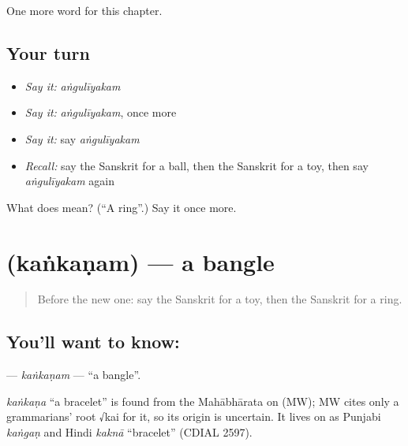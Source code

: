 \begin{grammarlens}[title={What you've built}]
One more word for this chapter.
\end{grammarlens}

\subsection*{Your turn}
\begin{itemize}
\raggedright
  \item \emph{Say it:} \emph{aṅgulīyakam}
  \item \emph{Say it:} \emph{aṅgulīyakam}, once more
  \item \emph{Say it:} say \emph{aṅgulīyakam}
  \item \emph{Recall:} say the Sanskrit for a ball, then the Sanskrit for a toy, then say \emph{aṅgulīyakam} again
\end{itemize}

\begin{tcolorbox}[breakable,colback=teal!4,colframe=teal!35!black,title={Before you move on}]
What does  mean? (\textquotedblleft{}A ring\textquotedblright{}.) Say it once more.
\end{tcolorbox}
\section[\texorpdfstring{\sk{कंकणम्} (kaṅkaṇam)}{कंकणम् (kaṅkaṇam)}]{ (kaṅkaṇam) — a bangle}

\label{lesson:SA-C103-kankanam}



\begin{quote}
Before the new one: say the Sanskrit for a toy, then the Sanskrit for a ring.
\end{quote}

\subsection*{You'll want to know: }
\textbf{} — \emph{kaṅkaṇam} — \textquotedblleft{}a bangle\textquotedblright{}.

\begin{cousinweb}
\emph{kaṅkaṇa} \textquotedblleft{}a bracelet\textquotedblright{} is found from the Mahābhārata on (MW); MW cites only a grammarians' root √kai for it, so its origin is uncertain. It lives on as Punjabi \emph{kaṅgaṇ} and Hindi \emph{kaknā} \textquotedblleft{}bracelet\textquotedblright{} (CDIAL 2597).
\end{cousinweb}

